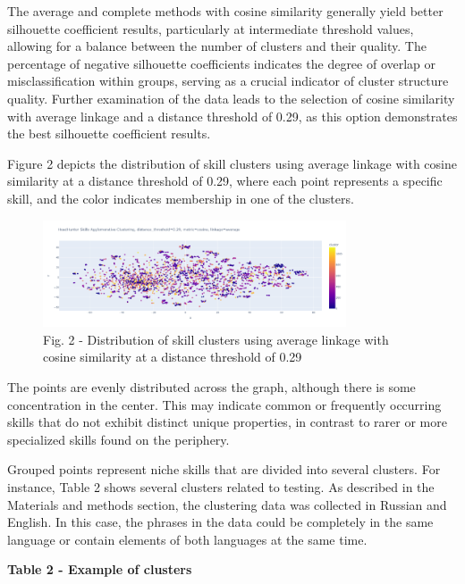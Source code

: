 The average and complete methods with cosine similarity generally yield
better silhouette coefficient results, particularly at intermediate
threshold values, allowing for a balance between the number of clusters
and their quality. The percentage of negative silhouette coefficients
indicates the degree of overlap or misclassification within groups,
serving as a crucial indicator of cluster structure quality. Further
examination of the data leads to the selection of cosine similarity with
average linkage and a distance threshold of 0.29, as this option
demonstrates the best silhouette coefficient results.

Figure 2 depicts the distribution of skill clusters using average
linkage with cosine similarity at a distance threshold of 0.29, where
each point represents a specific skill, and the color indicates
membership in one of the clusters.

\begin{figure}[H]
	\centering
	\includegraphics[width=0.8\textwidth]{media/ict/image105}
	\caption*{Fig. 2 - Distribution of skill clusters using average linkage
with cosine similarity at a distance threshold of 0.29}
\end{figure}

The points are evenly distributed across the graph, although there is
some concentration in the center. This may indicate common or frequently
occurring skills that do not exhibit distinct unique properties, in
contrast to rarer or more specialized skills found on the periphery.

Grouped points represent niche skills that are divided into several
clusters. For instance, Table 2 shows several clusters related to
testing. As described in the Materials and methods section, the
clustering data was collected in Russian and English. In this case, the
phrases in the data could be completely in the same language or contain
elements of both languages at the same time.

{\bfseries Table 2 - Example of clusters}

